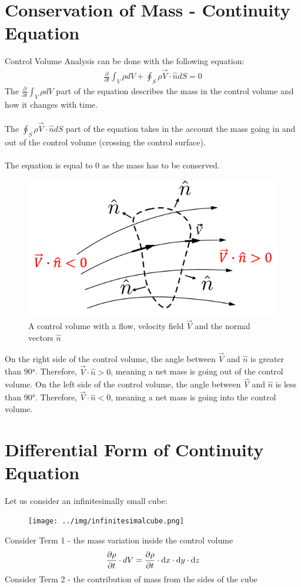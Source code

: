 \documentclass[class=report, crop=false, 12pt,a4paper]{standalone}
\begin{document}
\section{Conservation of Mass - Continuity Equation}
Control Volume Analysis can be done with the following equation:
\begin{gather}
    \frac{\partial}{\partial t} \int_{V}{\rho dV} + \oint_{S}{\rho \vec{V} \cdot \hat{n}dS} = 0
    \label{conservationofmass}
\end{gather}
The $\frac{\partial}{\partial t} \int_{V}{\rho dV}$ part of the equation describes the mass in the control volume and how it changes with time. \\\\
The $\oint_{S}{\rho \vec{V} \cdot \hat{n}dS}$ part of the equation takes in the account the mass going in and out of the control volume (crossing the control surface). \\\\
The equation is equal to 0 as the mass has to be conserved.
\begin{figure}[H]
    \centering
    \includegraphics[width = 0.7 \textwidth]{../img/Control Volume.PNG}
    \caption{A control volume with a flow, velocity field $\vec{V}$ and the normal vectors $\hat{n}$}
\end{figure}
On the right side of the control volume, the angle between $\vec{V}$ and $\hat{n}$ is greater than 90$\si{\degree}$. Therefore, $\vec{V} \cdot \hat{n} > 0$, meaning a net mass is going out of the control volume.
On the left side of the control volume, the angle between $\vec{V}$ and $\hat{n}$ is less than 90$\si{\degree}$. Therefore, $\vec{V} \cdot \hat{n} < 0$, meaning a net mass is going into the control volume.
\section{Differential Form of Continuity Equation}
Let us consider an infinitesimally small cube:
\begin{figure}[H]
  \centering
  \texttt{[image: ../img/infinitesimalcube.png]}
\end{figure}
Consider Term 1 - the mass variation inside the control volume
\begin{gather}
    \frac{\partial \rho}{\partial t} \cdot dV = \frac{\partial \rho}{\partial t} \cdot\dif x \cdot \dif y \cdot \dif z
    \label{massvariation}
\end{gather}
Consider Term 2 - the contribution of mass from the sides of the cube
\end{document}
